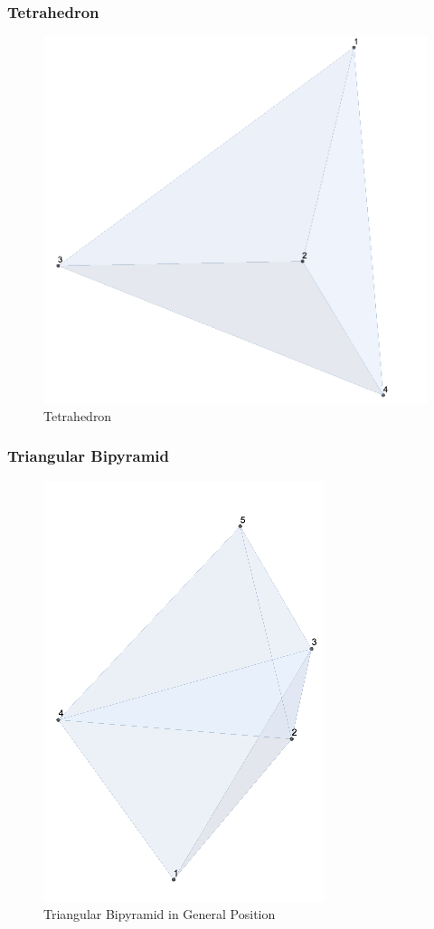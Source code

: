 \documentclass{beamer}
\begin{document}
\begin{frame}
\frametitle{Tetrahedron}
    \begin{figure}[h] %
        \includegraphics[scale = 0.4]{Tetra.png} %
        \caption{Tetrahedron}
    \end{figure}
\end{frame}


\begin{frame}
\frametitle{Triangular Bipyramid}
    \begin{figure}[h] %
        \includegraphics[scale = 0.4]{TriBiPy.png} %
        \caption{Triangular Bipyramid in General Position}
    \end{figure}
\end{frame}
\end{document}
